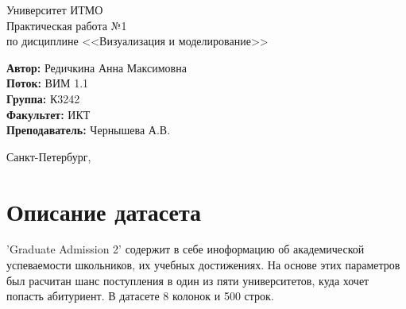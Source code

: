 \documentclass[12pt,a4paper]{article}
\begin{document}
	
\begin{titlepage}
	
\begin{center}
	\large Университет ИТМО\\[5cm]
	\LARGE Практическая работа №1\\
	\normalsize по дисциплине <<Визуализация и моделирование>>\\[5cm]
\end{center}
\begin{flushright}
		\begin{minipage}{0.6\textwidth}
		\begin{flushleft}
			\large
			\singlespacing 
			\textbf{Автор:} Редичкина Анна Максимовна\\
			\textbf{Поток:} ВИМ 1.1\\
			\textbf{Группа:} К3242\\
			\textbf{Факультет:} ИКТ\\
			\textbf{Преподаватель:} Чернышева А.В.
		\end{flushleft}
	\end{minipage}
\end{flushright}

\vfill

\begin{center}
	{\large Санкт-Петербург, \the{}}
\end{center}
 
\end{titlepage}
\normalsize


\section{Описание датасета}
'Graduate Admission 2' содержит в себе иноформацию об академической успеваемости школьников, их учебных достижениях. На основе этих параметров был расчитан шанс поступления в один из пяти университетов, куда хочет попасть абитуриент. В датасете 8 колонок и 500 строк. 
\end{document}
